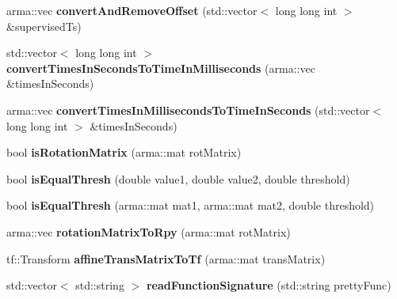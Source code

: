 \begin{DoxyCompactItemize}
\item 
arma\+::vec {\bfseries convert\+And\+Remove\+Offset} (std\+::vector$<$ long long int $>$ \&supervised\+Ts)\hypertarget{namespacekukadu_a18361dc96b8c117998bc32a1205adcc3}{}\label{namespacekukadu_a18361dc96b8c117998bc32a1205adcc3}

\item 
std\+::vector$<$ long long int $>$ {\bfseries convert\+Times\+In\+Seconds\+To\+Time\+In\+Milliseconds} (arma\+::vec \&times\+In\+Seconds)\hypertarget{namespacekukadu_a0a1d43be4965f4bc2ebdada67d464e85}{}\label{namespacekukadu_a0a1d43be4965f4bc2ebdada67d464e85}

\item 
arma\+::vec {\bfseries convert\+Times\+In\+Milliseconds\+To\+Time\+In\+Seconds} (std\+::vector$<$ long long int $>$ \&times\+In\+Seconds)\hypertarget{namespacekukadu_a0f8f908b625ca24f85ecfff55383e12c}{}\label{namespacekukadu_a0f8f908b625ca24f85ecfff55383e12c}

\item 
bool {\bfseries is\+Rotation\+Matrix} (arma\+::mat rot\+Matrix)\hypertarget{namespacekukadu_ad72f06157a9020795d91ad718fae0eb3}{}\label{namespacekukadu_ad72f06157a9020795d91ad718fae0eb3}

\item 
bool {\bfseries is\+Equal\+Thresh} (double value1, double value2, double threshold)\hypertarget{namespacekukadu_ac1ffe4279cd75c3385f5feb3e1da9a75}{}\label{namespacekukadu_ac1ffe4279cd75c3385f5feb3e1da9a75}

\item 
bool {\bfseries is\+Equal\+Thresh} (arma\+::mat mat1, arma\+::mat mat2, double threshold)\hypertarget{namespacekukadu_a118783cb87fb764ebcc238ef9af257e2}{}\label{namespacekukadu_a118783cb87fb764ebcc238ef9af257e2}

\item 
arma\+::vec {\bfseries rotation\+Matrix\+To\+Rpy} (arma\+::mat rot\+Matrix)\hypertarget{namespacekukadu_a1569839c747b33a4b8dd6f713cc42126}{}\label{namespacekukadu_a1569839c747b33a4b8dd6f713cc42126}

\item 
tf\+::\+Transform {\bfseries affine\+Trans\+Matrix\+To\+Tf} (arma\+::mat trans\+Matrix)\hypertarget{namespacekukadu_a784596811a945607bcd7b00ccc3ec688}{}\label{namespacekukadu_a784596811a945607bcd7b00ccc3ec688}

\item 
std\+::vector$<$ std\+::string $>$ {\bfseries read\+Function\+Signature} (std\+::string pretty\+Func)\hypertarget{namespacekukadu_a928aee311dfd6d3e4df68dece4fded2a}{}\label{namespacekukadu_a928aee311dfd6d3e4df68dece4fded2a}


\end{DoxyCompactItemize}
